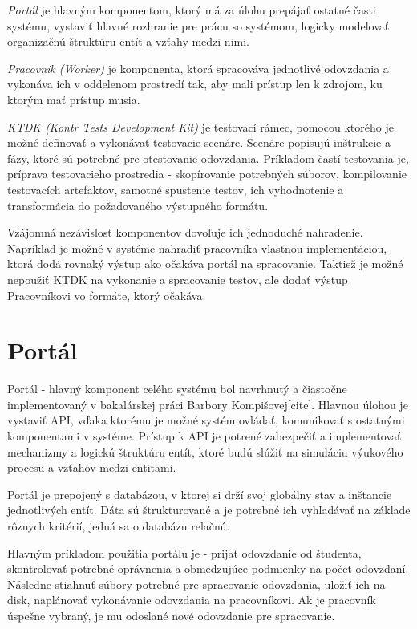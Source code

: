 \documentclass[
  digital, %
  twoside, %
  table,   %
  lof,     %
  lot,     %
]{fithesis3}
\begin{document}
\textit{Portál} je hlavným komponentom, ktorý má za úlohu prepájať ostatné časti systému, vystaviť hlavné rozhranie pre prácu so systémom, logicky modelovať organizačnú štruktúru entít a vzťahy medzi nimi. 

\textit{Pracovník (Worker)} je komponenta, ktorá spracováva jednotlivé odovzdania a vykonáva ich v oddelenom prostredí tak, aby mali prístup len k zdrojom, ku ktorým mať prístup musia.

\textit{KTDK (Kontr Tests Development Kit)} je testovací rámec, pomocou ktorého je možné definovať a vykonávať testovacie scenáre. Scenáre popisujú inštrukcie a fázy, ktoré sú potrebné pre otestovanie odovzdania. Príkladom častí testovania je, príprava testovacieho prostredia - skopírovanie potrebných súborov, kompilovanie testovacích artefaktov, samotné spustenie testov, ich vyhodnotenie a transformácia do požadovaného výstupného formátu. 

Vzájomná nezávislosť komponentov dovoľuje ich jednoduché nahradenie. Napríklad je možné v systéme nahradiť pracovníka vlastnou implementáciou, ktorá dodá rovnaký výstup ako očakáva portál na spracovanie. Taktiež je možné nepoužiť KTDK na vykonanie a spracovanie testov, ale dodať výstup Pracovníkovi vo formáte, ktorý očakáva.

\section{Portál}

Portál - hlavný komponent celého systému bol navrhnutý a čiastočne implementovaný v bakalárskej práci Barbory Kompišovej[cite]. Hlavnou úlohou je vystaviť API, vďaka ktorému je možné systém ovládať, komunikovať s ostatnými komponentami v systéme. Prístup k API je potrené zabezpečiť a implementovať mechanizmy a logickú štruktúru entít, ktoré budú slúžiť na simuláciu výukového procesu a vzťahov medzi entitami.

Portál je prepojený s databázou, v ktorej si drží svoj globálny stav a inštancie jednotlivých entít. Dáta sú štrukturované a je potrebné ich vyhľadávať na základe rôznych kritérií, jedná sa o databázu relačnú.  

Hlavným príkladom použitia portálu je - prijať odovzdanie od študenta, skontrolovať potrebné oprávnenia a obmedzujúce podmienky na počet odovzdaní. Následne stiahnuť súbory potrebné pre spracovanie odovzdania, uložiť ich na disk, naplánovať vykonávanie odovzdania na pracovníkovi. Ak je pracovník úspešne vybraný, je mu odoslané nové odovzdanie pre spracovanie.
\end{document}
